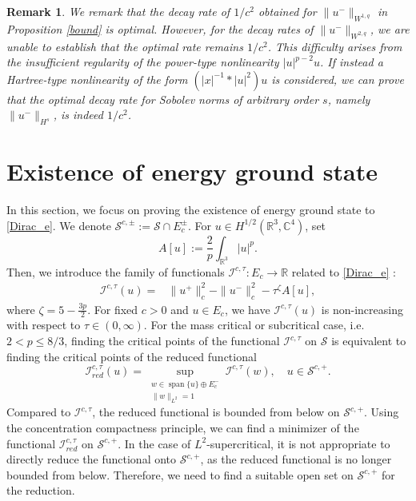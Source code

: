 \documentclass{amsart}
\theoremstyle{plain}
\newtheorem{remark}[theorem]{Remark}
\theoremstyle{definition}
\theoremstyle{remark}
\numberwithin{equation}{section} \numberwithin{figure}{section}
\begin{document}
\begin{remark}
  \normalfont
  We remark that the decay rate of $1/c^2$ obtained for
   $\|u^-\|_{W^{1,q}}$ in Proposition \ref{bound} is optimal.
    However, for the decay rates of $\|u^-\|_{W^{2,q}}$,
     we are unable to establish that the optimal rate remains $1/c^2$. 
     This difficulty arises from the insufficient regularity of 
     the power-type nonlinearity $|u|^{p-2}u$. 
     If instead a Hartree-type nonlinearity of the form $(|x|^{-1} * |u|^2)u$ 
     is considered, we can prove that the optimal decay rate for Sobolev norms 
     of arbitrary order $s$, namely $\|u^-\|_{H^s}$, is indeed $1/c^2$.
\end{remark}







\medskip






\section{Existence of energy ground state}\label{section3}
In this section, we focus on proving the existence of energy ground state to \eqref{Dirac_e}.
We denote $\mathcal{S}^{c,\pm}:= \mathcal{S}\cap E_c^\pm.$
For $u\in H^{1/2}(\mathbb{R}^3,\mathbb{C}^4)$,
set
$$
A[u]:=\frac{2}{p}\int_{\mathbb{R}^3} |u|^p.
$$
Then, we introduce the family of
  functionals $\mathcal{I}^{c, \tau} : E_c\rightarrow \mathbb{R}$  related to \eqref{Dirac_e} :
$$
\begin{aligned}
  \mathcal{I}^{c, \tau}({u})=&\|u^+\|_c^2-\|u^-\|_c^2
-\tau^{\zeta} A[u],
\end{aligned}
$$
where $\zeta= 5-\frac{3p }{2}$.
For fixed $c>0$ and $u\in E_c$, we have $\mathcal{I}^{c,\tau}(u)$ is non-increasing with respect to $\tau\in (0,\infty)$. 
For the mass critical or subcritical case, i.e. $2<p\leq 8/3$, finding the critical points of the functional \( \mathcal{I}^{c,\tau} \) on \( \mathcal{S} \) is equivalent to finding the critical points of the reduced functional
$$
\mathcal{I}_{red}^{c,\tau}(u)= \sup_{\substack{w\in \operatorname{span}\{u\}\oplus E_c^-\\\|w\|_{L^2}=1}}\mathcal{I}^{c,\tau}(w), \quad
u\in \mathcal{S}^{c,+}.
$$
 Compared to \( \mathcal{I}^{c,\tau} \), the reduced functional is bounded from below on \(  \mathcal{S}^{c,+} \). Using the concentration compactness principle, we can find a minimizer of the functional \( \mathcal{I}_{red}^{c,\tau} \) on \( \mathcal{S}^{c,+} \). 
In the case of $L^2$-supercritical, it is not appropriate to directly reduce the functional onto \(  \mathcal{S}^{c,+} \), as the reduced functional is no longer bounded from below. Therefore, we need to find a suitable open set on \(  \mathcal{S}^{c,+} \) for the reduction.
\end{document}
